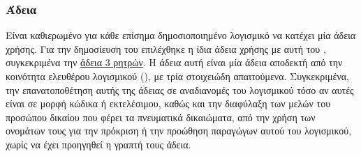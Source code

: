 \subsubsection{Άδεια}
Είναι καθιερωμένο για κάθε επίσημα δημοσιοποιημένο λογισμικό να κατέχει μία άδεια χρήσης.
Για την δημοσίευση του  επιλέχθηκε η ίδια άδεια χρήσης με αυτή του \href{https://en.wikipedia.org/wiki/Scikit-learn}{}, συγκεκριμένα την \href{https://en.wikipedia.org/wiki/BSD_licenses#3-clause_license_(%22BSD_License_2.0%22,_%22Revised_BSD_License%22,_%22New_BSD_License%22,_or_%22Modified_BSD_License%22)}{άδεια \en{BSD} 3 ρητρών}.
Η άδεια αυτή είναι μία άδεια αποδεκτή από την κοινότητα ελευθέρου λογισμικού (), με τρία στοιχειώδη απαιτούμενα.
Συγκεκριμένα, την επανατοποθέτηση αυτής της άδειας σε αναδιανομές του λογισμικού τόσο αν αυτές είναι σε μορφή κώδικα ή εκτελέσιμου, καθώς και την διαφύλαξη των μελών του προσώπου δικαίου που φέρει τα πνευματικά δικαιώματα, από την χρήση των ονομάτων τους για την πρόκριση ή την προώθηση παραγώγων αυτού του λογισμικού, χωρίς να έχει προηγηθεί η γραπτή τους άδεια.
